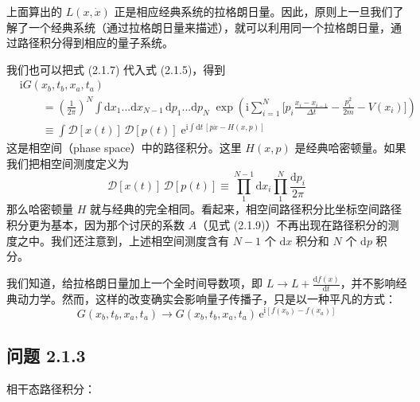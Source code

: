 上面算出的 $L(x,\dot{x})$ 正是相应经典系统的拉格朗日量。因此，原则上一旦我们了解了一个经典系统（通过拉格朗日量来描述），就可以利用同一个拉格朗日量，通过路径积分得到相应的量子系统。

我们也可以把式 (2.1.7) 代入式 (2.1.5)，得到
\begin{align*}
&\mathrm{i}G(x_b,t_b,x_a,t_a)\\
&\qquad = \left(\frac{1}{2\pi}\right)^{N} \int \mathrm{d}x_1...\mathrm{d}x_{N-1}\,\mathrm{d}p_1...\mathrm{d}p_N\; \exp\left(\mathrm{i}\sum_{i=1}^{N}\big[p_i\frac{x_i-x_{i-1}}{\Delta t} - \frac{p_i^2}{2m} - V(x_i)\big]\right)\\
&\qquad \equiv \int \mathcal{D}[x(t)]\,\mathcal{D}[p(t)]\; \mathrm{e}^{\mathrm{i}\int \mathrm{d}t\,[p\dot{x} - H(x,p)]} \tag{2.1.11}
\end{align*}
这是相空间（phase space）中的路径积分。这里 $H(x,p)$ 是经典哈密顿量。如果我们把相空间测度定义为
\begin{equation*}
\mathcal{D}[x(t)]\,\mathcal{D}[p(t)] \equiv \prod_1^{N-1} \mathrm{d}x_i \prod_1^{N} \frac{\mathrm{d}p_i}{2\pi} \tag{2.1.12}
\end{equation*}
那么哈密顿量 $H$ 就与经典的完全相同。看起来，相空间路径积分比坐标空间路径积分更为基本，因为那个讨厌的系数 $A$（见式 (2.1.9)）不再出现在路径积分的测度之中。我们还注意到，上述相空间测度含有 $N-1$ 个 $\mathrm{d}x$ 积分和 $N$ 个 $\mathrm{d}p$ 积分。

我们知道，给拉格朗日量加上一个全时间导数项，即 $L \to L + \frac{\mathrm{d}f(x)}{\mathrm{d}t}$，并不影响经典动力学。然而，这样的改变确实会影响量子传播子，只是以一种平凡的方式：
\begin{equation*}
G(x_b,t_b,x_a,t_a) \to G(x_b,t_b,x_a,t_a)\,\mathrm{e}^{\mathrm{i}[f(x_b)-f(x_a)]}
\end{equation*}

\subsection*{问题 2.1.3}

相干态路径积分：

